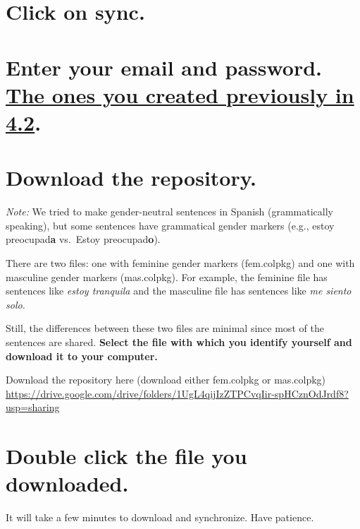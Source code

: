 \documentclass[
]{book}
\begin{document}
\hypertarget{click-on-sync.}{%
\section{Click on sync.}\label{click-on-sync.}}

\hypertarget{enter-your-email-and-password.-the-ones-you-created-previously-in-4.2.}{%
\section{\texorpdfstring{Enter your email and password. \protect\hyperlink{cross_3}{The ones you created previously in 4.2}.}{Enter your email and password. The ones you created previously in 4.2.}}\label{enter-your-email-and-password.-the-ones-you-created-previously-in-4.2.}}

\hypertarget{download-the-repository.}{%
\section{Download the repository.}\label{download-the-repository.}}

\emph{Note:} We tried to make gender-neutral sentences in Spanish (grammatically speaking), but some sentences have grammatical gender markers (e.g., estoy preocupad\textbf{a} vs.~Estoy preocupad\textbf{o}).

There are two files: one with feminine gender markers (fem.colpkg) and one with masculine gender markers (mas.colpkg). For example, the feminine file has sentences like \emph{estoy tranquila} and the masculine file has sentences like \emph{me siento solo.}

Still, the differences between these two files are minimal since most of the sentences are shared. \textbf{Select the file with which you identify yourself and download it to your computer.}

Download the repository here (download either fem.colpkg or mas.colpkg) \url{https://drive.google.com/drive/folders/1UgL4qijIzZTPCvqIir-spHCznOdJrdf8?usp=sharing}

\hypertarget{double-click-the-file-you-downloaded.}{%
\section{Double click the file you downloaded.}\label{double-click-the-file-you-downloaded.}}

It will take a few minutes to download and synchronize. Have patience.
\end{document}
